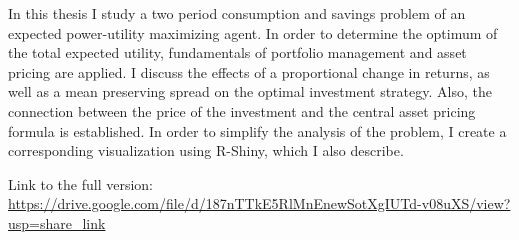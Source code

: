 In this thesis I study a two period consumption and savings problem of an expected power-utility maximizing agent. In order to determine the optimum of the total expected utility, fundamentals of portfolio management and asset pricing are applied. I discuss the effects of a proportional change in returns, as well as a mean preserving spread on the optimal investment strategy. Also, the connection between the price of the investment and the central asset pricing formula is established. In order to simplify the analysis of the problem, I create a corresponding visualization using R-Shiny, which I also describe.\\

\vspace{2cm}

\noindent
Link to the full version:\\
\url{https://drive.google.com/file/d/187nTTkE5RlMnEnewSotXgIUTd-v08uXS/view?usp=share_link}